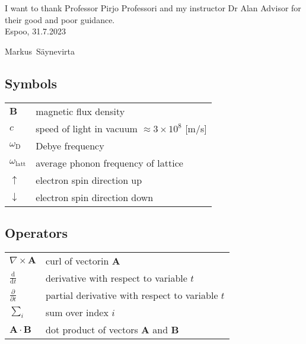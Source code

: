 \documentclass[english, 12pt, a4paper, elec, utf8, a-1b, online]{aaltothesis}
\begin{document}
I want to thank Professor Pirjo Professori and my instructor Dr Alan Advisor for 
their good and poor guidance.\\

\vspace{5cm}
Espoo, 31.7.2023

\vspace{5mm}
{\hfill Markus\ Säynevirta \hspace{1cm}}

\newpage


\thesistableofcontents



\subsection*{Symbols}

\begin{tabular}{ll}
$\mathbf{B}$  & magnetic flux density  \\
$c$              & speed of light in vacuum $\approx 3\times10^8$ [m/s]\\
$\omega_{\mathrm{D}}$    & Debye frequency \\
$\omega_{\mathrm{latt}}$ & average phonon frequency of lattice \\
$\uparrow$       & electron spin direction up\\
$\downarrow$     & electron spin direction down
\end{tabular}

\subsection*{Operators}

\begin{tabular}{ll}
$\nabla \times \mathbf{A}$              & curl of vectorin $\mathbf{A}$\\
$\displaystyle\frac{\mbox{d}}{\mbox{d} t}$ & derivative with respect to 
variable $t$\\[3mm]
$\displaystyle\frac{\partial}{\partial t}$  & partial derivative with respect 
to variable $t$ \\[3mm]
$\sum_i $                       & sum over index $i$\\
$\mathbf{A} \cdot \mathbf{B}$    & dot product of vectors $\mathbf{A}$ and 
$\mathbf{B}$
\end{tabular}
\end{document}
